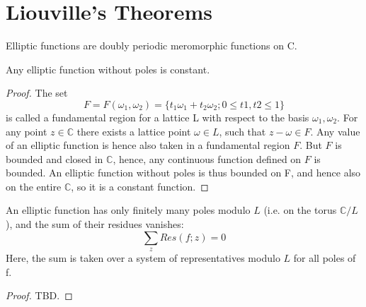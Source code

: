 \section{Liouville's Theorems}

\begin{definition}
    Elliptic functions are doubly periodic meromorphic functions on C.
\end{definition}

\begin{theorem}
    Any elliptic function without poles is constant.
\end{theorem}
\begin{proof}
    The set
    \[F = F(\omega_1, \omega_2) = \{ t_1 \omega_1 + t_2 \omega_2 ; 0 \leq t1, t2 \leq 1 \}\]
    is called a fundamental region for a lattice L with respect to the basis $\omega_1, \omega_2$.
    For any point $z \in \mathbb{C}$ there exists a lattice point $\omega \in L$, such that
    $z-\omega \in F$. Any value of an elliptic function is hence also taken in a fundamental region $F$.
    But $F$ is bounded and closed in $\mathbb{C}$, hence, any continuous function defined on $F$ is bounded.
    An elliptic function without poles is thus bounded on F, and hence also on the entire $\mathbb{C}$,
    so it is a constant function.
\end{proof}

\begin{theorem}
    An elliptic function has only finitely many poles modulo $L$ (i.e. on the torus $\mathbb{C} / L$), and the
    sum of their residues vanishes:
    \[ \sum_z Res(f; z)=0\]
    Here, the sum is taken over a system of representatives modulo $L$ for all poles of f.
\end{theorem}
\begin{proof}
    TBD.
\end{proof}